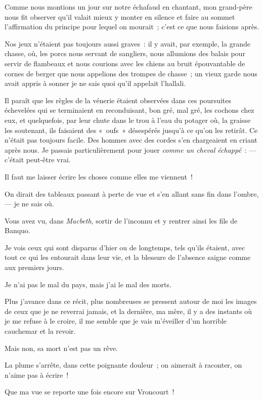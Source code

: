 \documentclass[french,twoside]{book} %
\begin{document}
Comme nous montions un jour sur notre échafaud en chantant, mon grand-père nous fit observer qu’il valait mieux y monter en silence et faire au sommet l’affirmation du principe pour lequel on mourait ; c’est ce que nous faisions après.\par
Nos jeux n’étaient pas toujours aussi graves : il y avait, par exemple, la grande chasse, où, les porcs nous servant de sangliers, nous allumions des balais pour servir de flambeaux et nous courions avec les chiens au bruit épouvantable de cornes de berger que nous appelions des trompes de chasse ; un vieux garde nous avait appris à sonner je ne sais quoi qu’il appelait l’hallali.\par
Il paraît que les règles de la vénerie étaient observées dans ces poursuites échevelées qui se terminaient en reconduisant, bon gré, mal gré,  les cochons chez eux, et quelquefois, par leur chute dans le trou à l’eau du potager où, la graisse les soutenant, ils faisaient des « oufs » désespérés jusqu’à ce qu’on les retirât. Ce n’était pas toujours facile. Des hommes avec des cordes s’en chargeaient en criant après nous. Je passais particulièrement pour jouer \emph{comme un cheval échappé} : — c’était peut-être vrai.\par
Il faut me laisser écrire les choses comme elles me viennent !\par
On dirait des tableaux passant à perte de vue et s’en allant sans fin dans l’ombre, — je ne sais où.\par
Vous avez vu, dans \emph{Macbeth}, sortir de l’inconnu et y rentrer ainsi les fils de Banquo.\par
Je vois ceux qui sont disparus d’hier ou de longtemps, tels qu’ils étaient, avec tout ce qui les entourait dans leur vie, et la blessure de l’absence saigne comme aux premiers jours.\par
Je n’ai pas le mal du pays, mais j’ai le mal des morts.\par
Plus j’avance dans ce récit, plus nombreuses se pressent autour de moi les images de ceux que je ne reverrai jamais, et la dernière, ma mère, il y a des instants où je me refuse à le croire, il me semble que je vais m’éveiller d’un horrible cauchemar et la revoir.\par
 Mais non, sa mort n’est pas un rêve.\par
La plume s’arrête, dans cette poignante douleur ; on aimerait à raconter, on n’aime pas à écrire !\par
Que ma vue se reporte une fois encore sur Vroncourt !\par
\end{document}
